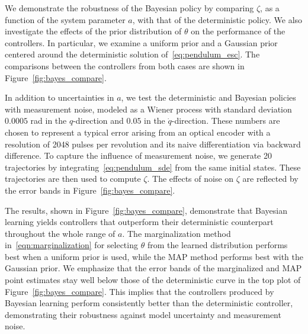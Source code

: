 We demonstrate the robustness of the Bayesian policy by comparing $\zeta$,
as a function of the system parameter $a$, with that of the deterministic
policy.
%
We also investigate the effects of the prior distribution of $\theta$ on the
performance of the controllers.
%
In particular, we examine a uniform prior and a Gaussian prior centered around
the deterministic solution of~\eqref{eq:pendulum_esc}.
%
The comparisons between the controllers from both cases are shown in
Figure~\ref{fig:bayes_compare}.
%

In addition to uncertainties in $a$, we test the deterministic and Bayesian
policies with measurement noise, modeled as a Wiener process with standard
deviation $0.0005$ \unit{rad} in the $q$-direction and $0.05$ 
in the $\dot{q}$-direction.
%
These numbers are chosen to represent a typical error arising from an
optical encoder with a resolution of 2048 pulses per revolution and its naive
differentiation via backward difference.
%
To capture the influence of measurement noise, we generate 20 trajectories
by integrating~\eqref{eq:pendulum_sde} from the same initial states. 
%
These trajectories are then used to compute $\zeta$. 
%
The effects of noise on $\zeta$ are reflected by the error bands in
Figure~\ref{fig:bayes_compare}.

The results, shown in Figure~\ref{fig:bayes_compare}, demonstrate that Bayesian
learning yields controllers that outperform their deterministic counterpart
throughout the whole range of $a$.
%
The marginalization method in~\eqref{eqn:marginalization} for selecting $\theta$
from the learned distribution performs best when a uniform prior is used, while
the MAP method performs best with the Gaussian prior.
%
We emphasize that the error bands of the marginalized and MAP point
estimates stay well below those of the deterministic curve in the top plot of
Figure~\ref{fig:bayes_compare}.
%
This implies that the controllers produced by Bayesian learning perform
consistently better than the deterministic controller, demonstrating their
robustness against model uncertainty and measurement noise.


